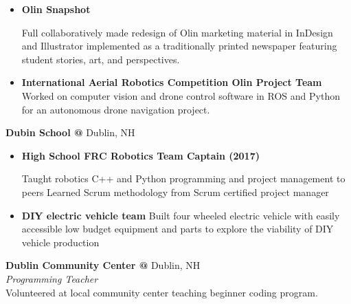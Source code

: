 \documentclass[10pt]{article} %
\begin{document}
\begin{minipage}[t]{0.8\textwidth}
\begin{itemize} [noitemsep,topsep=0pt]
  Developed a full-stack web app in a team with Vue, Python, and MariaDB that coordinates student schedules, pulling information from Google Calendar services and optimizing possible meeting times in a multi-user system.
  \item {}\textbf{Olin Snapshot }
  
  Full collaboratively made redesign of Olin marketing material in InDesign and Illustrator implemented as a traditionally printed newspaper featuring student stories, art, and perspectives.
  \item {}\textbf{International Aerial Robotics Competition Olin Project Team}
  Worked on computer vision and drone control software in ROS and Python for an autonomous drone navigation project.
  \\
\end{itemize}
\textbf{Dubin School @} \space Dublin, NH\\
\begin{itemize} [noitemsep,topsep=0pt]
  \item {}\textbf{High School FRC Robotics Team Captain (2017)}
  
  Taught robotics C++ and Python programming and project management to peers Learned Scrum methodology from Scrum certified project manager
  \item {}\textbf{DIY electric vehicle team }
  Built four wheeled electric vehicle with easily accessible low budget equipment and parts to explore the viability of DIY vehicle production
  \\
\end{itemize}
\textbf{Dublin Community Center @} \space Dublin, NH \\
\textit{Programming Teacher}\\
Volunteered at local community center teaching beginner coding program.
\end{minipage}
\hspace{0.5cm}
\end{document}
